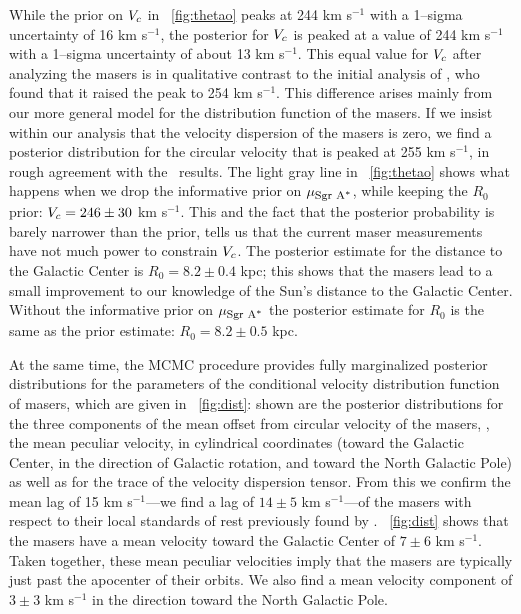 While the prior on $V_c$ in \figurename~\ref{fig:thetao} peaks at 244
km s$^{-1}$ with a 1--sigma uncertainty of 16 km s$^{-1}$, the
posterior for $V_c$ is peaked at a value of 244 km s$^{-1}$ with a
1--sigma uncertainty of about 13 km s$^{-1}$. This equal value for
$V_c$ after analyzing the masers is in qualitative contrast to the
initial analysis of \reid, who found that it raised the peak to 254 km
s$^{-1}$. This difference arises mainly from our more general model
for the distribution function of the masers. If we insist within our
analysis that the velocity dispersion of the masers is zero, we find a
posterior distribution for the circular velocity that is peaked at 255
km s$^{-1}$, in rough agreement with the \reid\ results. The light
gray line in \figurename~\ref{fig:thetao} shows what happens when we
drop the informative prior on $\mu_{\mbox{{\footnotesize Sgr A$^*$}}}$, while keeping the $R_0$
prior: $V_c = 246 \pm 30$ km s$^{-1}$. This and the fact that the
posterior probability is barely narrower than the prior, tells us that
the current maser measurements have not much power to constrain
$V_c$. The posterior estimate for the distance to the Galactic Center
is $R_0 = 8.2 \pm 0.4$ kpc; this shows that the masers lead to a small
improvement to our knowledge of the Sun's distance to the Galactic
Center. Without the informative prior on $\mu_{\mbox{{\footnotesize Sgr A$^*$}}}$ the posterior
estimate for $R_0$ is the same as the prior estimate: $R_0 = 8.2 \pm
0.5$ kpc.

At the same time, the MCMC procedure provides fully marginalized
posterior distributions for the parameters of the conditional velocity
distribution function of masers, which are given in
\figurename~\ref{fig:dist}: shown are the posterior distributions for
the three components of the mean offset from circular velocity of the
masers, \ie, the mean peculiar velocity, in cylindrical coordinates
(toward the Galactic Center, in the direction of Galactic rotation,
and toward the North Galactic Pole) as well as for the trace of the
velocity dispersion tensor. From this we confirm the mean lag of 15 km
s$^{-1}$---we find a lag of $14 \pm 5$ km s$^{-1}$---of the masers
with respect to their local standards of rest previously found by
\reid. \figurename~\ref{fig:dist} shows that the masers have a mean
velocity toward the Galactic Center of $7 \pm 6$ km s$^{-1}$. Taken
together, these mean peculiar velocities imply that the masers are
typically just past the apocenter of their orbits. We also find a mean
velocity component of $3 \pm 3$ km s$^{-1}$ in the direction toward
the North Galactic Pole.

